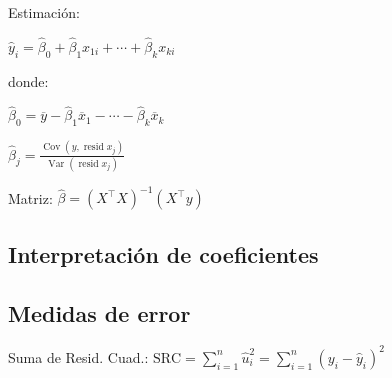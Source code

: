 \documentclass[10pt, a4paper, landscape]{article}
\DeclareMathOperator{\Var}{Var}
\DeclareMathOperator{\Cov}{Cov}
\DeclareMathOperator{\resid}{resid}
\newcommand{\SSR}{\text{SRC}}
\begin{document}
\begin{multicols}{3}
\begin{multicols}{2}
Estimación:

\begin{center}
	\( \hat{y}_{i} = \hat{\beta}_{0} + \hat{\beta}_{1} x_{1i} + \cdots + \hat{\beta}_{k} x_{ki} \)
\end{center}

donde:

\begin{center}
	\( \hat{\beta}_{0} = \overline{y} - \hat{\beta}_{1} \overline{x}_{1} - \cdots - \hat{\beta}_{k} \overline{x}_{k} \)

	\( \hat{\beta}_{j} = \frac{\Cov(y, \resid x_{j})}{\Var(\resid x_{j})} \)
\end{center}

Matriz: \( \hat{\beta} = (X^{\top} X)^{-1}(X^{\top} y) \)

\end{multicols}

\subsection*{Interpretación de coeficientes}

\begin{center}
\end{center}

\subsection*{Medidas de error}

Suma de Resid. Cuad.: \hfill \( \SSR = \sum_{i = 1}^{n} \hat{u}_{i}^{2} = \sum_{i = 1}^{n} (y_{i} - \hat{y}_{i})^{2} \)


\end{multicols}
\end{document}
